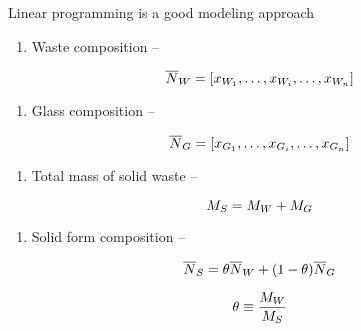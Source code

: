 \documentclass[aspectratio=1610,pdftex,dvipsnames,compress,xcolor={dvipsnames}]{beamer}
\begin{document}
\addtocounter{framenumber}{-1} 
\begin{frame}{Linear programming is a good modeling approach}
    \begin{enumerate}[series=outerlist,topsep=0pt,itemsep=1pt,leftmargin=*,label=(\arabic*)]
        \item[]Waste composition --
    \end{enumerate}

    \vspace*{\fill}

    \begin{equation}
        \Large
        \overline{N}_W = [x_{W_1}, \ldots, x_{W_i}, \ldots, x_{W_n}]
    \end{equation}

    \vspace*{\fill}

    \begin{enumerate}[series=outerlist,topsep=0pt,itemsep=1pt,leftmargin=*,label=(\arabic*)]
        \item[]Glass composition --
    \end{enumerate}

    \vspace*{\fill}

    \begin{equation}
        \Large
        \overline{N}_G = [x_{G_1}, \ldots, x_{G_i}, \ldots, x_{G_n}]
    \end{equation}

    \vspace*{\fill}

    \begin{enumerate}[series=outerlist,topsep=0pt,itemsep=1pt,leftmargin=*,label=(\arabic*)]
        \item[]Total mass of solid waste --
    \end{enumerate}

    \vspace*{\fill}

    \begin{equation}
        \Large
        M_S = M_W + M_G
    \end{equation}

    \vspace*{\fill}

    \begin{enumerate}[series=outerlist,topsep=0pt,itemsep=1pt,leftmargin=*,label=(\arabic*)]
        \item[]Solid form composition --
    \end{enumerate}

    \vspace*{\fill}

    \begin{equation}
        \Large
        \overline{N}_S = \theta\overline{N}_W + (1 - \theta)\overline{N}_G
    \end{equation}

    \begin{equation}
        \Large
        \theta \equiv \frac{M_W}{M_S}
    \end{equation}
\end{frame}
\end{document}
